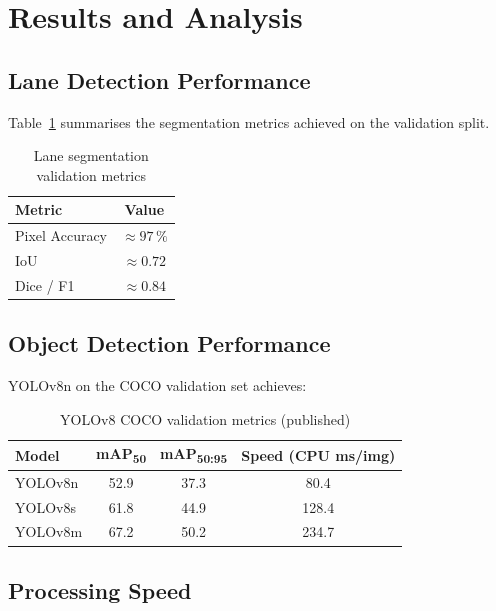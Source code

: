 \documentclass[12pt, a4paper]{article}
\begin{document}
\section{Results and Analysis}

\subsection{Lane Detection Performance}

Table~\ref{tab:lane_results} summarises the segmentation metrics achieved
on the validation split.

\begin{table}[H]
  \centering
  \caption{Lane segmentation validation metrics}
  \begin{tabular}{lc}
    \toprule
    \textbf{Metric} & \textbf{Value} \\
    \midrule
    Pixel Accuracy  & $\approx 97\,\%$ \\
    IoU             & $\approx 0.72$   \\
    Dice / F1       & $\approx 0.84$   \\
    \bottomrule
  \end{tabular}
  \label{tab:lane_results}
\end{table}

\subsection{Object Detection Performance}

YOLOv8n on the COCO validation set achieves:

\begin{table}[H]
  \centering
  \caption{YOLOv8 COCO validation metrics (published)}
  \begin{tabular}{lccc}
    \toprule
    \textbf{Model} & \textbf{mAP\textsubscript{50}} &
    \textbf{mAP\textsubscript{50:95}} & \textbf{Speed (CPU ms/img)} \\
    \midrule
    YOLOv8n & 52.9 & 37.3 & 80.4 \\
    YOLOv8s & 61.8 & 44.9 & 128.4 \\
    YOLOv8m & 67.2 & 50.2 & 234.7 \\
    \bottomrule
  \end{tabular}
  \label{tab:yolo_results}
\end{table}

\subsection{Processing Speed}
\end{document}

